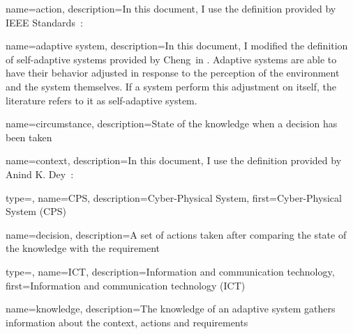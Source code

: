 {
	name={action},
	description={In this document, I use the definition provided by IEEE Standards~\cite{iso2017systems}: }
}

{
	name={adaptive system},
	description={In this document, I modified the definition of self-adaptive systems provided by Cheng~\etal in \cite{DBLP:conf/dagstuhl/ChengLGIMABBBCSDFGGGKKKLMMMPSTTWW09}. Adaptive systems are able to have their behavior adjusted in response to the perception of the environment and the system themselves. If a system perform this adjustment on itself, the literature refers to it as self-adaptive system.}
}

{
	name={circumstance},
	description={State of the \gls{knowledge} when a \gls{decision} has been taken}
}

{
	name={context},
	description={In this document, I use the definition provided by Anind K. Dey~\cite{DBLP:journals/puc/Dey01}: }
}

{
	type=\acronymtype,
	name={CPS},
	description={Cyber-Physical System},
	first={Cyber-Physical System (CPS)}
}

{
	name={decision},
	description={A set of \glspl{action} taken after comparing the state of the \gls{knowledge} with the \gls{requirement}}
}

{
	type=\acronymtype,
	name={ICT},
	description={Information and communication technology},
	first={Information and communication technology (ICT)}
}

{
	name={knowledge},
	description={The knowledge of an adaptive system gathers information about the \gls{context}, \glspl{action} and \glspl{requirement}}
}

